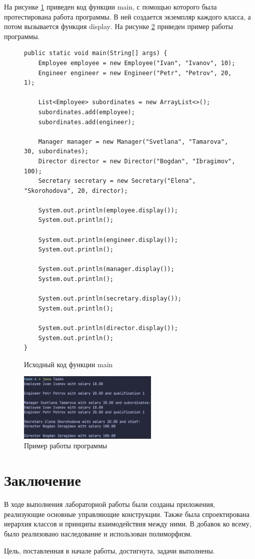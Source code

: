 \documentclass[a4paper, 14pt]{extarticle}
\begin{document}
На рисунке \ref{fig:task-4-1} приведен код функции
\foreignlanguage{english}{main}, с помощью которого была протестирована работа
программы. В ней создается экземпляр каждого класса, а потом вызывается функция
\foreignlanguage{english}{display}. На рисунке \ref{fig:task-4-2} приведен
пример работы программы.

\begin{figure}[H]
  \centering
  \begin{verbatim}
public static void main(String[] args) {
    Employee employee = new Employee("Ivan", "Ivanov", 10);
    Engineer engineer = new Engineer("Petr", "Petrov", 20, 1);
    
    List<Employee> subordinates = new ArrayList<>();
    subordinates.add(employee);
    subordinates.add(engineer);

    Manager manager = new Manager("Svetlana", "Tamarova", 30, subordinates);
    Director director = new Director("Bogdan", "Ibragimov", 100);
    Secretary secretary = new Secretary("Elena", "Skorohodova", 20, director);

    System.out.println(employee.display());
    System.out.println();

    System.out.println(engineer.display());
    System.out.println();

    System.out.println(manager.display());
    System.out.println();

    System.out.println(secretary.display());
    System.out.println();

    System.out.println(director.display());
    System.out.println();
}
  \end{verbatim}
  \caption{Исходный код функции main}
  \label{fig:task-4-1}
\end{figure}

\begin{figure}[H]
  \centering
  \includegraphics[width=0.6\textwidth]{images/task-4}
  \caption{Пример работы программы}
  \label{fig:task-4-2}
\end{figure}

\section*{Заключение}

В ходе выполнения лабораторной работы были созданы приложения, реализующие
основные управляющие конструкции. Также была спроектирована иерархия классов и
принципы взаимодействия между ними. В добавок ко всему, было реализовано
наследование и использован полиморфизм.

Цель, поставленная в начале работы, достигнута, задачи выполнены.
\end{document}
